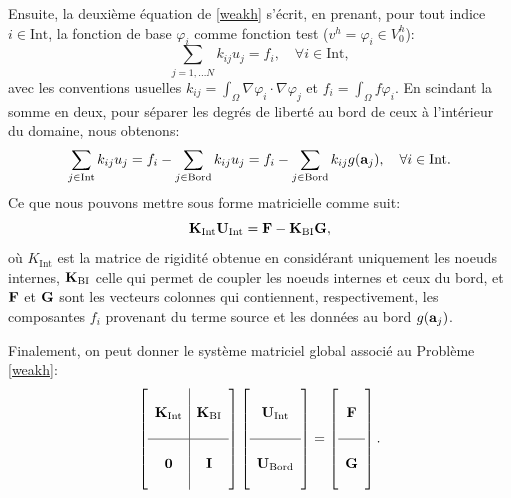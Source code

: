 \documentclass[11pt]{book}
\def\a{{\bf a}}
\def\I{{\bf I}}
\def\F{{\bf F}}
\def\U{{\bf U}}
\def\K{{\bf K}}
\def\0{{\bf 0}}
\def\GG{{\bf G}}
\begin{document}
Ensuite, la deuxième équation de \eqref{weakh} s'écrit, en prenant, pour tout indice $i \in \mathrm{Int}$, la fonction de base $\varphi_i$ comme fonction test ($v^h = \varphi_i \in V^h_0$):
\[
\sum_{j=1,\ldots N} k_{ij} u_j = f_i, \quad \forall i \in \mathrm{Int},
\]
avec les conventions usuelles $k_{ij} = \int_\Omega \nabla \varphi_i \cdot \nabla \varphi_j$ et $f_i = \int_\Omega f \varphi_i$. 
En scindant la somme en deux, pour séparer les degrés de liberté au bord de ceux à l'intérieur du domaine, nous obtenons:
\[
\sum_{j\in\mathrm{Int}} k_{ij} u_j = f_i - \sum_{j\in\mathrm{Bord}} k_{ij} u_j =
f_i - \sum_{j\in\mathrm{Bord}} k_{ij} g (\a_j)
, \quad \forall i \in \mathrm{Int}.
\]
Ce que nous pouvons mettre sous forme matricielle comme suit:
\[
 \K_{\mathrm{Int}} \U_{\mathrm{Int}} = \F - \K_{\mathrm{BI}} \GG,
\]
où $K_{\mathrm{Int}}$ est la matrice de rigidité obtenue en considérant uniquement les noeuds internes, 
$\K_{\mathrm{BI}}$ celle qui permet de coupler les noeuds internes et ceux du bord, et $\F$ et $\GG$ sont les vecteurs colonnes qui contiennent, respectivement, les composantes $f_i$ provenant du terme source et les données au bord $g(\a_j)$.

Finalement, on peut donner le système matriciel global associé au Problème \eqref{weakh}:
\[
 \left [ \begin{array}{c|c} \\ \K_{\mathrm{Int}} & \K_{\mathrm{BI}} \\ \\ \hline \\ 
 \0 & \I \\ \\ \end{array} \right ]
 \left [ \begin{array}{c} \\ \U_{\mathrm{Int}} \\ \\ \hline \\ \U_{\mathrm{Bord}} \\ \\ \end{array} \right ]
 = \left [ \begin{array}{c} \\ \F \\ \\ \hline \\ \GG \\ \\ \end{array} \right ].
\]
\end{document}
